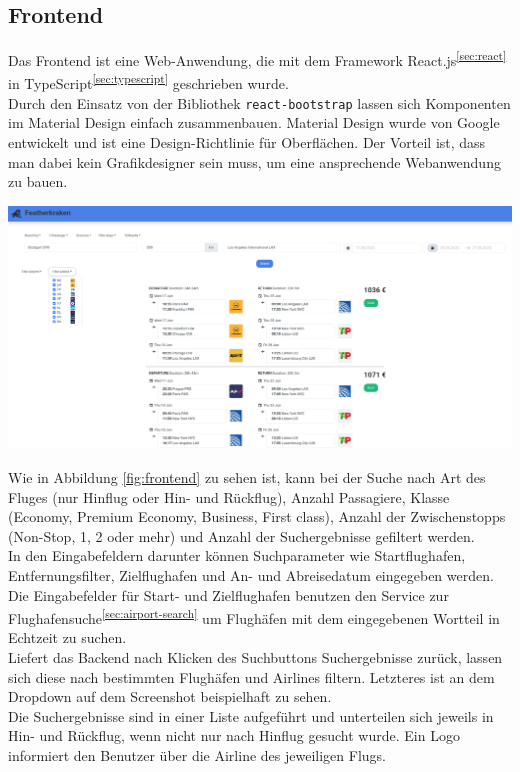 \documentclass[12pt,twoside,a4paper]{article}
\begin{document}
\begin{sloppypar}
\subsection{Frontend}
Das Frontend ist eine Web-Anwendung, die mit dem Framework React.js\textsuperscript{\ref{sec:react}} in TypeScript\textsuperscript{\ref{sec:typescript}} geschrieben wurde.\\
Durch den Einsatz von der Bibliothek \texttt{react-bootstrap} lassen sich Komponenten im Material Design einfach zusammenbauen. Material Design wurde von Google entwickelt und ist eine Design-Richtlinie für Oberflächen. Der Vorteil ist, dass man dabei kein Grafikdesigner sein muss, um eine ansprechende Webanwendung zu bauen.
\begin{center}
	\captionsetup{type=figure}
	\includegraphics[width=\textwidth]{images/frontend-screenshot}
	\label{fig:frontend}
\end{center}
Wie in Abbildung \ref{fig:frontend} zu sehen ist, kann bei der Suche nach Art des Fluges (nur Hinflug oder Hin- und Rückflug), Anzahl Passagiere, Klasse (Economy, Premium Economy, Business, First class), Anzahl der Zwischenstopps (Non-Stop, 1, 2 oder mehr) und Anzahl der Suchergebnisse gefiltert werden.\\
In den Eingabefeldern darunter können Suchparameter wie Startflughafen, Entfernungsfilter, Zielflughafen und An- und Abreisedatum eingegeben werden. Die Eingabefelder für Start- und Zielflughafen benutzen den Service zur Flughafensuche\textsuperscript{\ref{sec:airport-search}} um Flughäfen mit dem eingegebenen Wortteil in Echtzeit zu suchen.\\
Liefert das Backend nach Klicken des Suchbuttons Suchergebnisse zurück, lassen sich diese nach bestimmten Flughäfen und Airlines filtern. Letzteres ist an dem Dropdown auf dem Screenshot beispielhaft zu sehen.\\
Die Suchergebnisse sind in einer Liste aufgeführt und unterteilen sich jeweils in Hin- und Rückflug, wenn nicht nur nach Hinflug gesucht wurde. Ein Logo informiert den Benutzer über die Airline des jeweiligen Flugs.
\newpage

\end{sloppypar}
\end{document}
